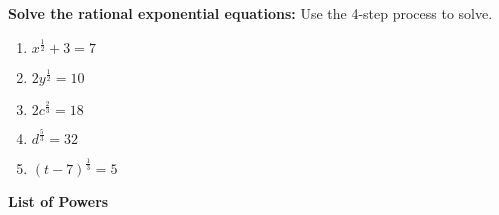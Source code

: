 \documentclass[12pt]{article}
\begin{document}
\pagebreak

\textbf{Solve the rational exponential equations:} Use the 4-step process to solve.\\

\begin{enumerate}[resume]

	\item $x^{\frac{1}{2}}+3=7$\\
	
	\item $2y^{\frac{1}{2}}=10$\\
	
	\item $2c^{\frac{2}{3}}=18$\\
	
	\item $d^{\frac{5}{3}}=32$\\
	
	\item $(t-7)^{\frac{1}{3}}=5$\\


\end{enumerate}

\hrulefill

\textbf{List of Powers}\\
\end{document}
